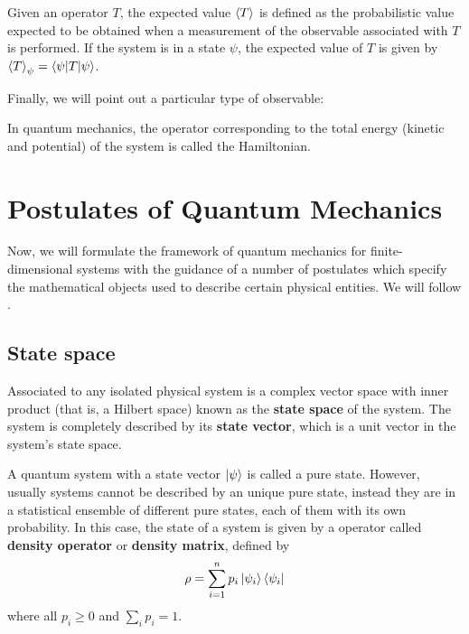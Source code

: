 \begin{definicion}
    Given an operator $T$, the expected value $\braket{T}$ is defined as the probabilistic value expected to be obtained when a measurement of the observable associated with $T$ is performed. If the system is in a state $\psi$, the expected value of $T$ is given by $\braket{T}_{\psi}=\braket{\psi | T | \psi}$.     
\end{definicion}

Finally, we will point out a particular type of observable:

\begin{definicion}[Hamiltonian]
    In quantum mechanics, the operator corresponding to the total energy (kinetic and potential) of the system is called the Hamiltonian.
\end{definicion}


\section{Postulates of Quantum Mechanics} \label{sec: postulates of QM}
Now, we will formulate the framework of quantum mechanics for finite-dimensional systems with the guidance of a number of postulates which specify the mathematical objects used to describe certain physical entities. We will follow \cite{nielsen_chuang_2010}.

\subsection{State space} \label{sec: state space}
\begin{tcolorbox}[title=Postulate $1$]

    Associated to any isolated physical system is a complex vector space with inner product (that is, a Hilbert space) known as the \textbf{state space} of the system. The system is completely described by its \textbf{state vector}, which is a unit vector in the system's state space.
\end{tcolorbox}

A quantum system with a state vector $\ket{\psi}$ is called a pure state. However, usually systems cannot be described by an unique pure state, instead they are in a statistical ensemble of different pure states, each of them with its own probability. In this case, the state of a system is given by a operator called \textbf{density operator} or \textbf{density matrix}, defined by
\begin{equation}
    \rho = \sum_{i=1}^{n} p_i \ket{\psi_i}\bra{\psi_i}
\end{equation}
where all $p_i \geq 0 $ and $\sum_i p_i = 1$.

